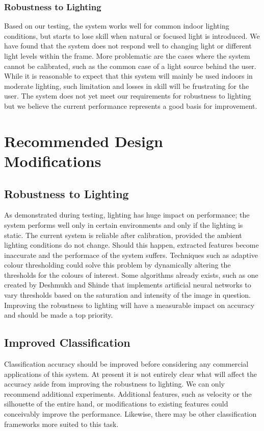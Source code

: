 \documentclass[12pt]{article}
\begin{document}
\subsubsection{Robustness to Lighting}
Based on our testing, the system works well for common indoor lighting conditions, but starts to lose skill when natural or focused light is introduced. We have found that the system does not respond well to changing light or different light levels within the frame. More problematic are the cases where the system cannot be calibrated, such as the common case of a light source behind the user. While it is reasonable to expect that this system will mainly be used indoors in moderate lighting, such limitation and losses in skill will be frustrating for the user. The system does not yet meet our requirements for robustness to lighting but we believe the current performance represents a good basis for improvement. 

\newpage
\section{Recommended Design Modifications}
\subsection{Robustness to Lighting}
As demonstrated during testing, lighting has huge impact on performance; the system performs well only in certain environments and only if the lighting is static. The current system is reliable after calibration, provided the ambient lighting conditions do not change. Should this happen, extracted features become inaccurate and the performace of the system suffers. Techniques such as adaptive colour thresholding could solve this problem by dynamically altering the thresholds for the colours of interest. Some algorithms already exists, such as one created by Deshmukh and Shinde \cite{adaptiveSegmentation} that implements artificial neural networks to vary thresholds based on the saturation and intensity of the image in question. Improving the robustness to lighting will have a measurable impact on accuracy and should be made a top priority.

\subsection{Improved Classification}
Classification accuracy should be improved before considering any commercial applications of this system. At present it is not entirely clear what will affect the accuracy aside from improving the robustness to lighting. We can only recommend additional experiments. Additional features, such as velocity or the silhouette of the entire hand, or modifications to existing features could conceivably improve the performance. Likewise, there may be other classification frameworks more suited to this task.
\end{document}
